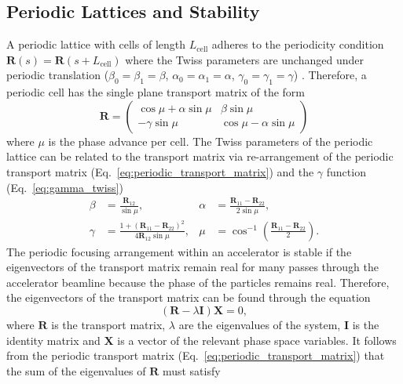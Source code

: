 \documentclass[../main.tex]{subfiles}
\begin{document}
\subsection{Periodic Lattices and Stability}

A periodic lattice with cells of length $L_{\mathrm{cell}}$ adheres to the periodicity condition $\boldsymbol{R}\left(s\right) = \boldsymbol{R}\left(s+L_{\mathrm{cell}}\right)$ where the Twiss parameters are unchanged under periodic translation ($\beta_{0}=\beta_{1}=\beta$, $\alpha_{0}=\alpha_{1}=\alpha$, $\gamma_{0}=\gamma_{1}=\gamma$) . Therefore, a periodic cell has the single plane transport matrix of the form
\begin{equation}
\boldsymbol{R} =
\begin{pmatrix}
\cos\mu + \alpha\sin\mu & \beta\sin\mu \\
-\gamma\sin\mu & \cos\mu-\alpha\sin\mu
\end{pmatrix}
\label{eq:periodic_transport_matrix}    
\end{equation}
where $\mu$ is the phase advance per cell. The Twiss parameters of the periodic lattice can be related to the transport matrix via re-arrangement of the periodic transport matrix (Eq.~\ref{eq:periodic_transport_matrix}) and the $\gamma$ function  (Eq.~\ref{eq:gamma_twiss})
\begin{align}
\beta &= \frac{\boldsymbol{R}_{12}}{\sin\mu}, &
\alpha & = \frac{\boldsymbol{R}_{11}-\boldsymbol{R}_{22}}{2\sin\mu},
 \nonumber\\
\gamma &= \frac{1+\left(\boldsymbol{R}_{11}-\boldsymbol{R}_{22}\right)^{2}}{4\boldsymbol{R}_{12}\sin\mu}, &
\mu &= \cos^{-1}\left(\frac{\boldsymbol{R}_{11}-\boldsymbol{R}_{22}}{2}\right).
\label{eq:periodic_twiss}
\end{align}
The periodic focusing arrangement within an accelerator is stable if the eigenvectors of the transport matrix remain real for many passes through the accelerator beamline because the phase of the particles remains real. Therefore, the eigenvectors of the transport matrix can be found through the equation
\begin{equation}
\left(\boldsymbol{R}-\lambda\boldsymbol{I}\right)\boldsymbol{X} = 0,
\label{eq:eigenvalues_equation}    
\end{equation}
where $\boldsymbol{R}$ is the transport matrix, $\lambda$ are the eigenvalues of the system, $\boldsymbol{I}$ is the identity matrix and $\boldsymbol{X}$ is a vector of the relevant phase space variables. It follows from the periodic transport matrix (Eq.~\ref{eq:periodic_transport_matrix}) that the sum of the eigenvalues of $\boldsymbol{R}$ must satisfy
\end{document}
